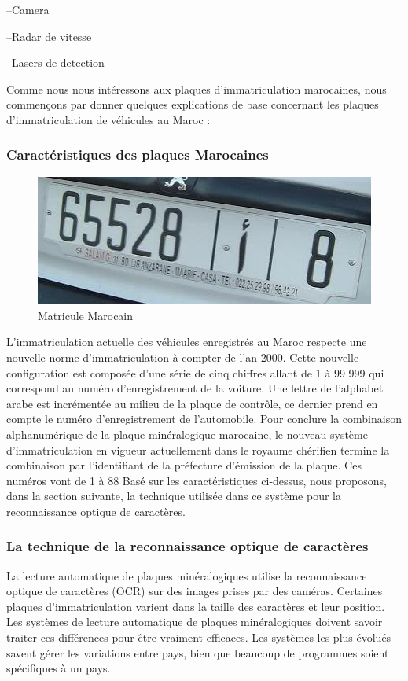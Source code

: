 \documentclass[11pt]{report}
\begin{document}
--Camera

--Radar de vitesse

--Lasers de detection

Comme nous nous intéressons aux plaques d’immatriculation marocaines,
nous commençons par donner quelques explications de base concernant les plaques
d’immatriculation de véhicules au Maroc :

\subsubsection{Caractéristiques des plaques Marocaines}
\begin{figure}[H]
	\begin{center}
		\includegraphics[width=12cm]{images/matricule.png}
		\caption{Matricule Marocain}
		\label{fig:figure}
	\end{center}
\end{figure}

L’immatriculation actuelle des véhicules enregistrés au Maroc respecte une nouvelle
norme d’immatriculation à compter de l’an 2000. Cette nouvelle configuration est
composée d’une série de cinq chiffres allant de 1 à 99 999 qui correspond au numéro
d’enregistrement de la voiture. Une lettre de l’alphabet arabe est incrémentée au
milieu de la plaque de contrôle, ce dernier prend en compte le numéro
d’enregistrement de l’automobile. Pour conclure la combinaison alphanumérique de la
plaque minéralogique marocaine, le nouveau système d’immatriculation en vigueur
actuellement dans le royaume chérifien termine la combinaison par l’identifiant de la
préfecture d’émission de la plaque. Ces numéros vont de 1 à 88
Basé sur les caractéristiques ci-dessus, nous proposons, dans la section
suivante, la technique utilisée dans ce système pour la reconnaissance optique de
caractères.

\subsubsection{La technique de la reconnaissance optique de caractères}
La lecture automatique de plaques minéralogiques utilise la
reconnaissance optique de caractères (OCR) sur des images prises par des caméras.
Certaines plaques d'immatriculation varient dans la taille des caractères et leur
position. Les systèmes de lecture automatique de plaques minéralogiques doivent
savoir traiter ces différences pour être vraiment efficaces. Les systèmes les plus
évolués savent gérer les variations entre pays, bien que beaucoup de programmes
soient spécifiques à un pays.
\end{document}
